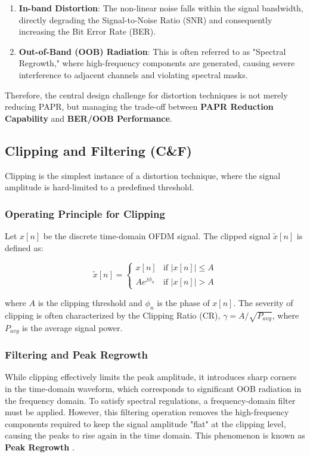 \documentclass[conference]{IEEEtran}
\begin{document}
\begin{enumerate}
    \item \textbf{In-band Distortion}: The non-linear noise falls within the signal bandwidth, directly degrading the Signal-to-Noise Ratio (SNR) and consequently increasing the Bit Error Rate (BER).
    \item \textbf{Out-of-Band (OOB) Radiation}: This is often referred to as "Spectral Regrowth," where high-frequency components are generated, causing severe interference to adjacent channels and violating spectral masks.
\end{enumerate}

Therefore, the central design challenge for distortion techniques is not merely reducing PAPR, but managing the trade-off between \textbf{PAPR Reduction Capability} and \textbf{BER/OOB Performance}.

\subsection{Clipping and Filtering (C\&F)}
Clipping is the simplest instance of a distortion technique, where the signal amplitude is hard-limited to a predefined threshold.

\subsubsection{Operating Principle for Clipping}
Let $x[n]$ be the discrete time-domain OFDM signal. The clipped signal $\tilde{x}[n]$ is defined as:

\begin{equation}
    \tilde{x}[n] = \begin{cases}
        x[n]          & \text{if } |x[n]| \le A \\
        A e^{j\phi_n} & \text{if } |x[n]| > A
    \end{cases}
\end{equation}

where $A$ is the clipping threshold and $\phi_n$ is the phase of $x[n]$. The severity of clipping is often characterized by the Clipping Ratio (CR), $\gamma = A / \sqrt{P_{avg}}$, where $P_{avg}$ is the average signal power.

\subsubsection{Filtering and Peak Regrowth}
While clipping effectively limits the peak amplitude, it introduces sharp corners in the time-domain waveform, which corresponds to significant OOB radiation in the frequency domain. To satisfy spectral regulations, a frequency-domain filter must be applied. However, this filtering operation removes the high-frequency components required to keep the signal amplitude "flat" at the clipping level, causing the peaks to rise again in the time domain. This phenomenon is known as \textbf{Peak Regrowth} \cite{ref9}.
\end{document}
